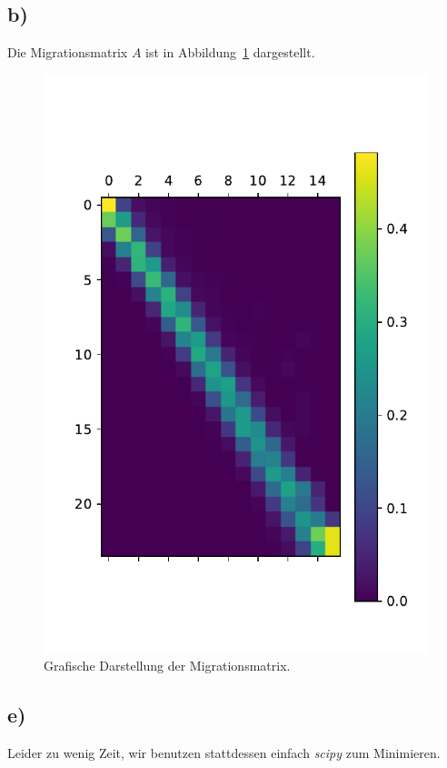 \documentclass[a4paper, 11pt]{article}
\begin{document}
\subsection*{b)}
Die Migrationsmatrix $A$ ist in Abbildung~\ref{fig:matrix} dargestellt.
\begin{figure}
    \centering
    \includegraphics[]{../A38/A37b.pdf}
    \caption{Grafische Darstellung der Migrationsmatrix.}
    \label{fig:matrix}
\end{figure}

\subsection*{e)}
Leider zu wenig Zeit, wir benutzen stattdessen einfach \textit{scipy} zum Minimieren.
\end{document}
